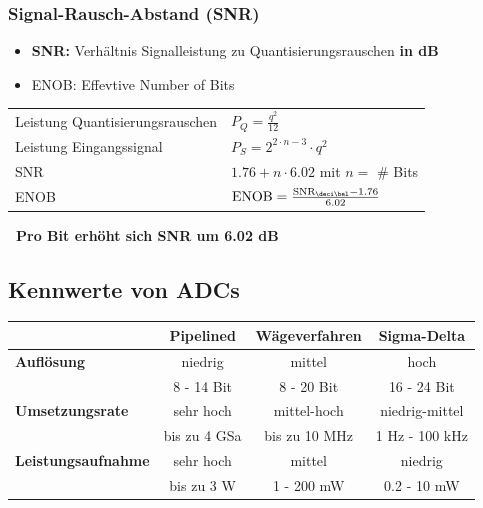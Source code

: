 \subsubsection{Signal-Rausch-Abstand (SNR)}

\begin{itemize}
    \item \textbf{SNR:} Verhältnis Signalleistung zu Quantisierungsrauschen \textbf{in dB}
    \item ENOB: Effevtive Number of Bits
\end{itemize}

\vspace{0.2cm}

\renewcommand{\arraystretch}{1.5}
\begin{tabular}{ll}
    Leistung Quantisierungsrauschen & $P_Q = \frac{q^2}{12}$                                            \\
    Leistung Eingangssignal         & $P_S = 2^{2 \cdot n - 3} \cdot q^2$                               \\
    SNR                             & $1.76 + n \cdot 6.02$ mit $n =$ \# Bits                           \\
    ENOB                            & $\mathrm{ENOB} = \frac{\mathrm{SNR_{\deci \bel}} - 1.76}{6.02}$ 
\end{tabular}
\renewcommand{\arraystretch}{1}

\vspace{0.2cm}

\textbf{ \textrightarrow\ Pro Bit erhöht sich SNR um 6.02 dB}
 
 
\subsection{Kennwerte von ADCs}

\begin{center}
    \begin{tabular}{lccc}
        \toprule
                                    & \textbf{Pipelined}    & \textbf{Wägeverfahren}    & \textbf{Sigma-Delta}      \\
        \midrule
        \textbf{Auflösung}          & niedrig               & mittel                    & hoch                      \\  
                                    & 8 - 14 Bit            & 8 - 20 Bit                & 16 - 24 Bit               \\
        \midrule
        \textbf{Umsetzungsrate}     & sehr hoch             & mittel-hoch               & niedrig-mittel            \\
                                    & bis zu 4 GSa          & bis zu 10 MHz             & 1 Hz - 100 kHz            \\
        \midrule
        \textbf{Leistungsaufnahme}  & sehr hoch             & mittel                    & niedrig                   \\
                                    & bis zu 3 W            & 1 - 200 mW                & 0.2 - 10 mW               \\
        \bottomrule
    \end{tabular}
\end{center}

